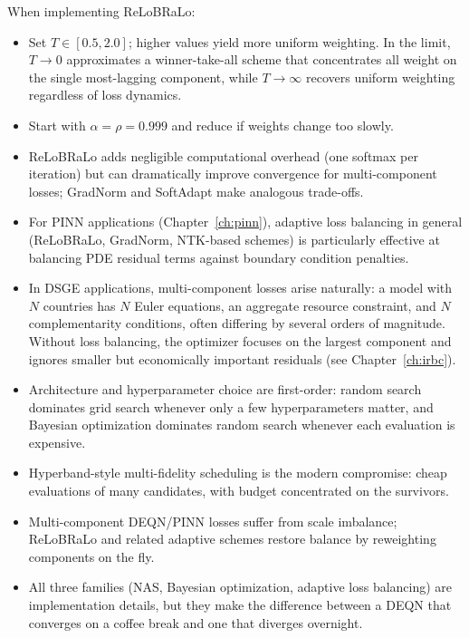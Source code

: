\documentclass[11pt,a4paper]{report}
\begin{document}
\begin{remarkbox}
When implementing ReLoBRaLo:
\begin{itemize}[itemsep=2pt]
\item Set $T \in [0.5, 2.0]$; higher values yield more uniform weighting.  In the limit, $T \to 0$ approximates a winner-take-all scheme that concentrates all weight on the single most-lagging component, while $T \to \infty$ recovers uniform weighting regardless of loss dynamics.
\item Start with $\alpha = \rho = 0.999$ and reduce if weights change too slowly.
\item ReLoBRaLo adds negligible computational overhead (one softmax per iteration) but can dramatically improve convergence for multi-component losses; GradNorm and SoftAdapt make analogous trade-offs.
\item For PINN applications (Chapter~\ref{ch:pinn}), adaptive loss balancing in general (ReLoBRaLo, GradNorm, NTK-based schemes) is particularly effective at balancing PDE residual terms against boundary condition penalties.
\item In DSGE applications, multi-component losses arise naturally: a model with $N$ countries has $N$ Euler equations, an aggregate resource constraint, and $N$ complementarity conditions, often differing by several orders of magnitude.  Without loss balancing, the optimizer focuses on the largest component and ignores smaller but economically important residuals (see Chapter~\ref{ch:irbc}).
\end{itemize}
\end{remarkbox}

\begin{keyinsightbox}
\begin{itemize}[itemsep=2pt, leftmargin=*]
\item Architecture and hyperparameter choice are first-order: random search dominates grid search whenever only a few hyperparameters matter, and Bayesian optimization dominates random search whenever each evaluation is expensive.
\item Hyperband-style multi-fidelity scheduling is the modern compromise: cheap evaluations of many candidates, with budget concentrated on the survivors.
\item Multi-component DEQN/PINN losses suffer from scale imbalance; ReLoBRaLo and related adaptive schemes restore balance by reweighting components on the fly.
\item All three families (NAS, Bayesian optimization, adaptive loss balancing) are implementation details, but they make the difference between a DEQN that converges on a coffee break and one that diverges overnight.
\end{itemize}
\end{keyinsightbox}
\end{document}
